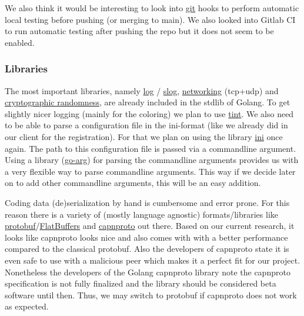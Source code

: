 \documentclass[a4paper,english,10pt,NET]{tumarticle}
\begin{document}
We also think it would be interesting to look into \href{https://git-scm.com/book/en/v2/Customizing-Git-Git-Hooks}{git} hooks to perform automatic local testing before pushing (or merging to main). We also looked into Gitlab CI to run automatic testing after pushing the repo but it does not seem to be enabled.  



\subsubsection{Libraries}
The most important libraries, namely
\href{https://pkg.go.dev/log}{log}
/
\href{https://pkg.go.dev/log/slog@go1.22.2}{slog},
\href{https://pkg.go.dev/net}{networking} (tcp+udp)
and
\href{https://pkg.go.dev/crypto/rand}{cryptographic randomness},
are already included in the stdlib of Golang.
To get slightly nicer logging (mainly for the coloring) we plan to use \href{github.com/lmittmann/tint}{tint}.
We also need to be able to parse a configuration file in the ini-format (like we already did in our client for the registration).
For that we plan on using the library \href{gopkg.in/ini.v1}{ini} once again.
The path to this configuration file is passed via a commandline argument.
Using a library (\href{https://github.com/alexflint/go-arg}{go-arg}) for parsing the commandline arguments provides us with a very flexible way to parse commandline arguments.
This way if we decide later on to add other commandline arguments, this will be an easy addition.

Coding data (de)serialization by hand is cumbersome and error prone.
For this reason there is a variety of (mostly language agnostic) formats/libraries like \href{https://protobuf.dev/}{protobuf}/\href{https://flatbuffers.dev/}{FlatBuffers} and \href{https://capnproto.org/}{capnproto} out there.
Based on our current research, it looks like capnproto looks nice and also comes with with a better performance compared to the classical protobuf.
Also the developers of capnproto state it is even safe to use with a malicious peer which makes it a perfect fit for our project.
Nonetheless the developers of the Golang capnproto library note the capnproto specification is not fully finalized and the library should be considered beta software until then.
Thus, we may switch to protobuf if capnproto does not work as expected.
\end{document}
